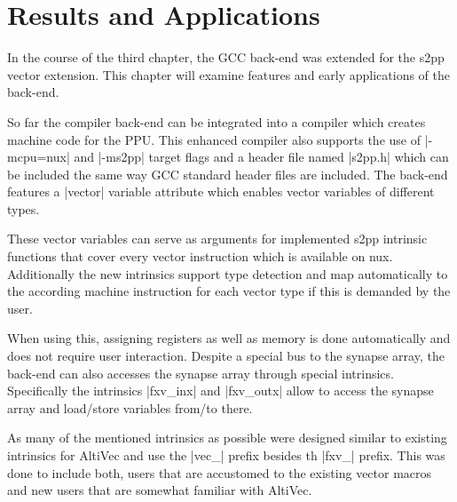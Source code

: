 \chapter{Results and Applications}
\label{ch:results}
In the course of the third chapter, the GCC back-end was extended for the s2pp vector extension.
This chapter will examine features and early applications of the back-end.

So far the compiler back-end can be integrated into a compiler which creates machine code for the PPU.
This enhanced compiler also supports the use of |-mcpu=nux| and |-ms2pp| target flags and a header file named |s2pp.h| which can be included the same way GCC standard header files are included.
The back-end features a |vector| variable attribute which enables vector variables of different types.

These vector variables can serve as arguments for implemented s2pp intrinsic functions that cover every vector instruction which is available on nux.
Additionally the new intrinsics support type detection and map automatically to the according machine instruction for each vector type if this is demanded by the user.

When using this, assigning registers as well as memory is done automatically and does not require user interaction.
Despite a special bus to the synapse array, the back-end can also accesses the synapse array through special intrinsics.
Specifically the intrinsics |fxv_inx| and |fxv_outx| allow to access the synapse array and load/store variables from/to there.

As many of the mentioned intrinsics as possible were designed similar to existing intrinsics for AltiVec and use the |vec_| prefix besides th |fxv_| prefix.
This was done to include both, users that are accustomed to the existing vector macros and new users that are somewhat familiar with AltiVec.

